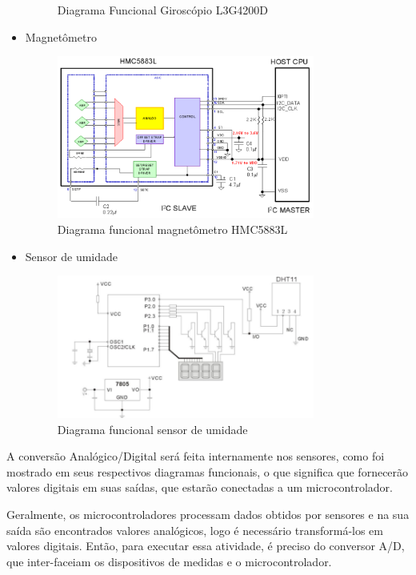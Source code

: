 \begin{itemize}
\begin{figure}[H]
    \caption[Diagrama Funcional Giroscópio L3G4200D]{Diagrama Funcional Giroscópio L3G4200D~\cite{giroscopio}}
    \label{img:giroscopio}
  \end{figure}
  \item Magnetômetro
  \begin{figure}[H]
    \centering
    \includegraphics[width=0.8\textwidth]{figuras/6}
    \caption[Diagrama funcional magnetômetro HMC5883L]{Diagrama funcional magnetômetro HMC5883L~\cite{magnetometro}}
    \label{img:magnetometro}
  \end{figure}
  \item Sensor de umidade
  \begin{figure}[H]
    \centering
    \includegraphics[width=0.8\textwidth]{figuras/5}
    \caption[Diagrama funcional sensor de umidade]{Diagrama funcional sensor de umidade~\cite{sensorhumidade}}
    \label{img:sensorumidade}
  \end{figure}
\end{itemize}

A conversão Analógico/Digital será feita internamente nos sensores, como foi mostrado em seus respectivos diagramas funcionais, o que significa que fornecerão valores digitais em suas saídas, que estarão conectadas a um microcontrolador.

Geralmente, os microcontroladores processam dados obtidos por sensores e na sua saída são encontrados valores analógicos, logo é necessário transformá-los em valores digitais. Então, para executar essa atividade, é preciso do conversor A/D, que inter-faceiam os dispositivos de medidas e o microcontrolador.

